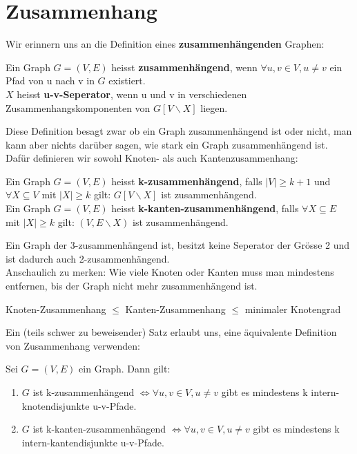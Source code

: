 \documentclass[a4paper]{report}
\begin{document}
\section{Zusammenhang}

Wir erinnern uns an die Definition eines \textbf{zusammenhängenden} Graphen:

\begin{definition}
    Ein Graph $G = (V,E)$ heisst \textbf{zusammenhängend}, wenn $\forall u,v \in V, u \neq v$ 
    ein Pfad von u nach v in $G$ existiert. \\

    $X$ heisst \textbf{u-v-Seperator}, wenn u und v in verschiedenen Zusammenhangskomponenten von
    $G[V \backslash X]$ liegen.
\end{definition}
\bigskip

Diese Definition besagt zwar ob ein Graph zusammenhängend ist oder nicht, man kann aber nichts darüber sagen,
wie stark ein Graph zusammenhängend ist. Dafür definieren wir sowohl Knoten- als auch Kantenzusammenhang:

\begin{definition}
    Ein Graph $G = (V,E)$ heisst \textbf{k-zusammenhängend}, falls $|V| \geq k + 1$ und $\forall X \subseteq V$
    mit $|X| \geq k$ gilt: $G[V \backslash X]$ ist zusammenhängend. \\

    Ein Graph $G = (V,E)$ heisst \textbf{k-kanten-zusammenhängend}, falls $\forall X \subseteq E$
    mit $|X| \geq k$ gilt: $(V, E \backslash X)$ ist zusammenhängend.
\end{definition}
\bigskip

Ein Graph der 3-zusammenhängend ist, besitzt keine Seperator der Grösse 2 und ist dadurch auch 2-zusammenhängend. \\

Anschaulich zu merken: Wie viele Knoten oder Kanten muss man mindestens entfernen, bis der Graph nicht mehr
zusammenhängend ist.

\begin{lemma}
    Knoten-Zusammenhang $\leq$ Kanten-Zusammenhang $\leq$ minimaler Knotengrad
\end{lemma}
\bigskip

Ein (teils schwer zu beweisender) Satz erlaubt uns, eine äquivalente Definition von Zusammenhang
verwenden:

\begin{satz}
    Sei $G = (V, E)$ ein Graph. Dann gilt:
    \begin{enumerate}
        \item $G$ ist k-zusammenhängend $\Leftrightarrow \forall u,v \in V, u \neq v$ gibt es mindestens k intern-knotendisjunkte u-v-Pfade.
        \item $G$ ist k-kanten-zusammenhängend $\Leftrightarrow \forall u,v \in V, u \neq v$ gibt es mindestens k intern-kantendisjunkte u-v-Pfade.
    \end{enumerate}
\end{satz}
\bigskip
\end{document}
